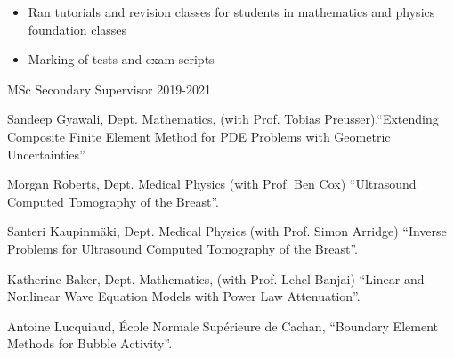 \documentclass[11pt, a4paper]{awesome-cv}
\begin{document}
\begin{cventries}
{\begin{itemize}[leftmargin=2ex, nosep, noitemsep, after=0pt]
\begin{itemize}
Project management skills, including liaising with host organisation and participating partner institutions from the United States
\end{itemize}
\item Ran tutorials and revision classes for students in mathematics and physics foundation classes
\item Marking of tests and exam scripts
\end{itemize}}
%
{MSc Secondary Supervisor}
{}
{2019-2021}{%
\begin{cvitems}
\item Sandeep Gyawali, Dept. Mathematics, (with Prof. Tobias Preusser).\newline{}\enquote{Extending Composite Finite Element Method for PDE Problems with Geometric Uncertainties}.
\end{cvitems}}
%
%
{\begin{cvitems}%
\item Morgan Roberts, Dept. Medical Physics (with Prof. Ben Cox) \enquote{Ultrasound Computed Tomography of the Breast}.
\item Santeri Kaupinm\"{a}ki, Dept. Medical Physics (with Prof. Simon Arridge) \enquote{Inverse Problems for Ultrasound Computed Tomography of the Breast}. 
\end{cvitems}}
%
%
{\begin{cvitems}%
\item Katherine Baker, Dept. Mathematics, (with Prof. Lehel Banjai) \enquote{Linear and Nonlinear Wave Equation Models with Power Law Attenuation}.
\end{cvitems}}
%
%
{\begin{cvitems}%
\item Antoine Lucquiaud, \'{E}cole Normale Sup\'{e}rieure de Cachan, \enquote{Boundary Element Methods for Bubble Activity}.
\end{cvitems}}
%
%
%
\end{cventries}
\end{document}
